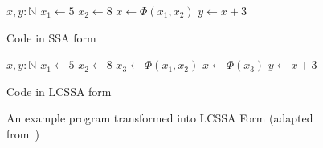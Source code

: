 \begin{figure}[h]
    \begin{minipage}[t]{0.5\textwidth}
        \centering
        \begin{algorithmic}
            \State $x, y: \mathbb{N}$
            \Repeat
            \State $x_1 \gets 5$
            \Else
            \State $x_2 \gets 8$
            \EndIf
            \State $x \gets \Phi(x_1, x_2)$
            \State $y \gets x + 3$
            \EndFunction
        \end{algorithmic}
        Code in SSA form
    \end{minipage}
    \begin{minipage}[t]{0.5\textwidth}
        \centering
        \begin{algorithmic}
            \State $x, y: \mathbb{N}$
            \Repeat
            \State $x_1 \gets 5$
            \Else
            \State $x_2 \gets 8$
            \EndIf
            \State $x_3 \gets \Phi(x_1, x_2)$
            \State $x \gets \Phi(x_3)$
            \State $y \gets x + 3$
            \EndFunction
        \end{algorithmic}
        Code in LCSSA form
    \end{minipage}
    \caption{An example program transformed into LCSSA Form (adapted from~\cite{LLVM_LCSSA})}
    \label{fig:basics:LCSSA}
\end{figure}
